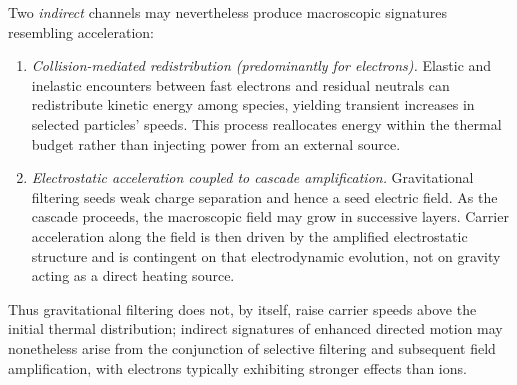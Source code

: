\documentclass[11pt,a4paper]{article}
\begin{document}
Two \emph{indirect} channels may nevertheless produce macroscopic signatures resembling acceleration:
\begin{enumerate}
  \item \emph{Collision-mediated redistribution (predominantly for electrons).} Elastic and inelastic encounters between fast electrons and residual neutrals can redistribute kinetic energy among species, yielding transient increases in selected particles' speeds. This process reallocates energy within the thermal budget rather than injecting power from an external source.
  \item \emph{Electrostatic acceleration coupled to cascade amplification.} Gravitational filtering seeds weak charge separation and hence a seed electric field. As the cascade proceeds, the macroscopic field may grow in successive layers. Carrier acceleration along the field is then driven by the amplified electrostatic structure and is contingent on that electrodynamic evolution, not on gravity acting as a direct heating source.
\end{enumerate}
Thus gravitational filtering does not, by itself, raise carrier speeds above the initial thermal distribution; indirect signatures of enhanced directed motion may nonetheless arise from the conjunction of selective filtering and subsequent field amplification, with electrons typically exhibiting stronger effects than ions.
\end{document}
